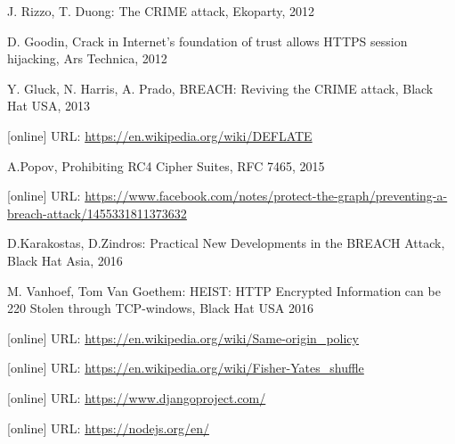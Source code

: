 \documentclass[a4paper, 11 pt, conference]{article}  %
\begin{document}
\begin{thebibliography}{10}

 J. Rizzo, T. Duong: The CRIME attack, Ekoparty, 2012

 D. Goodin, Crack in Internet’s foundation of trust allows HTTPS session hijacking, Ars Technica, 2012

 Y. Gluck, N. Harris, A. Prado, BREACH: Reviving the CRIME attack, Black Hat USA, 2013

 [online] URL: \url{https://en.wikipedia.org/wiki/DEFLATE} 

 A.Popov, Prohibiting RC4 Cipher Suites, RFC 7465, 2015

 [online] URL: \url{https://www.facebook.com/notes/protect-the-graph/preventing-a-breach-attack/1455331811373632}

  D.Karakostas, D.Zindros: Practical New Developments in the BREACH Attack, Black Hat Asia, 2016

 M. Vanhoef, Tom Van Goethem: HEIST: HTTP Encrypted Information can be 220 Stolen through TCP-windows, Black Hat USA 2016

[online] URL: \url{https://en.wikipedia.org/wiki/Same-origin_policy} 

 [online] URL: \url{https://en.wikipedia.org/wiki/Fisher-Yates_shuffle}

 [online] URL: \url{https://www.djangoproject.com/} 

 [online] URL: \url{https://nodejs.org/en/} 

\end{thebibliography}
\end{document}
